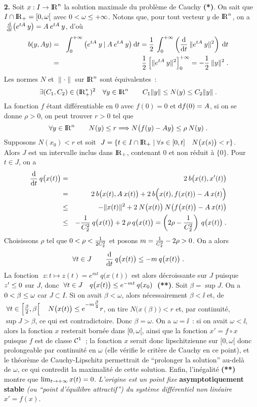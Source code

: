 \documentclass{article}
\begin{document}
\msk
{\bf 2.} Soit $x:I\rightarrow{\rm I\kern-0.6mm R}^n$ la solution maximale du probl\`eme de Cauchy {\bf (*)}. On sait que $I\cap{\rm I\kern-0.6mm R}_+=[0,\omega[$ avec $0<\omega\leq+\infty$.\msk\sect
Notons que, pour tout vecteur $y$ de ${\rm I\kern-0.6mm R}^n$, on a $\;{{\rm d}\over{\rm d}t}\big(e^{tA}\>y\big)=A\>e^{tA}\>y$, d'o\`u\vv
\begin{eqnarray*}
b(y,Ay) & = & \int_0^{+\infty}\big(e^{tA}\>y\>|\>A\>e^{tA}\>y\big)\>{\rm d}t={1\over2}\>\int_0^{+\infty}\left({{\rm d}\over{\rm d}t}\>\|e^{tA}\>y\|^2\right)\>{\rm d}t\\
& = & {1\over2}\>\Big[\|e^{tA}\>y\|^2\Big]_0^{+\infty}=-{1\over2}\>\|y\|^2\;.
\end{eqnarray*}
Les normes $N$ et $\|\cdot\|$ sur ${\rm I\kern-0.6mm R}^n$ sont \'equivalentes~:\vv
$$\exists(C_1,C_2)\in({\rm I\kern-0.6mm R}_+^*)^2\quad\forall y\in{\rm I\kern-0.6mm R}^n\qquad C_1\|y\|\leq N(y)\leq C_2\|y\|\;.$$
La fonction $f$ \'etant diff\'erentiable en 0 avec $f(0)=0$ et ${\rm d}f(0)=A$, si on se donne $\rho>0$, on peut trouver $r>0$ tel que\vv
$$\forall y\in{\rm I\kern-0.6mm R}^n\qquad N(y)\leq r\Longrightarrow N\big(f(y)-Ay\big)\leq\rho\>N(y)\;.$$
Supposons $N(x_0)<r$ et soit $\;J=\{t\in I\cap{\rm I\kern-0.6mm R}_+\;|\;\forall s\in[0,t]\quad N\big(x(s)\big)<r\}$. Alors $J$ est un intervalle inclus dans ${\rm I\kern-0.6mm R}_+$, contenant 0 et non r\'eduit \`a $\{0\}$. Pour $t\in J$, on a\vv
\begin{eqnarray*}
{{\rm d}\over{\rm d}t}\>q\big(x(t)\big) & = & 2\>b\big(x(t),x'(t)\big)\\
& = & 2\>b\big(x(t),A\>x(t)\big)+2\>b\Big(x(t),f(x(t))-A\>x(t)\Big)\\
& \leq & -\|x(t)\|^2+2\>N\big(x(t)\big)\>N\big(f\big(x(t)\big)-A\>x(t)\big)\\
& \leq & -{1\over C_2^2}\>q\big(x(t)\big)+2\>\rho\>q\big(x(t)\big)
=\left(2\rho-{1\over C_2^2}\right)\>q\big(x(t)\big)\;.
\end{eqnarray*}
Choisissons $\rho$ tel que $0<\rho<{1\over2C_2^2}$ et posons $m={1\over C_2^2}-2\rho>0$. On a alors
$$\forall t\in J\qquad {{\rm d}\over{\rm d}t}\>q\big(x(t)\big)\leq-m\>q\big(x(t)\big)\;.$$
La fonction $\;z:t\mapsto z(t)=e^{mt}\>q\big(x(t)\big)\;$ est alors d\'ecroissante sur $J$ puisque $z'\leq0$ sur $J$, donc $\;\forall t\in J\quad q\big(x(t)\big)\leq e^{-mt}\>q(x_0)\;$ {\bf (**)}.\ssk\sect
Soit $\beta=\sup J$. On a $0<\beta\leq\omega$ car $J\subset I$. Si on avait $\beta<\omega$, alors n\'ecessairement $\beta<\ii$ et, de $\;\a t\in\lc{\beta\s2},\beta\rci\quad N\big(x(t)\big)\ie e^{{}^{\sst-m{\sst\beta\sur\sst4}}}r$, on tire $N\big(x(\beta)\big)<r$ et, par continuit\'e, $\sup J>\beta$, ce qui est contradictoire. Donc $\beta=\omega$.\ssk\sect
On a $\omega=\ii$~: si on avait $\omega<\ii$, alors la fonction $x$ resterait born\'ee dans $[0,\omega[$, ainsi que la fonction $x'=f\circ x$ puisque $f$ est de classe ${\cal C}^1$~; la fonction $x$ serait donc lipschitzienne sur $[0,\omega[$ donc prolongeable par continuit\'e en $\omega$ (elle v\'erifie le crit\`ere de Cauchy en ce point), et le th\'eor\`eme de Cauchy-Lipschitz permettrait de ``prolonger la solution'' au-del\`a de $\omega$, ce qui contredit la maximalit\'e de cette solution.\ssk\sect
Enfin, l'in\'egalit\'e {\bf (**)} montre que $\lim_{t\rightarrow+\infty}x(t)=0$. {\it L'origine est un point fixe} {\bf asymptotiquement stable} {\it (ou ``point d'\'equilibre attractif'') du syst\`eme diff\'erentiel non lin\'eaire} $x'=f(x)$.
\end{document}

